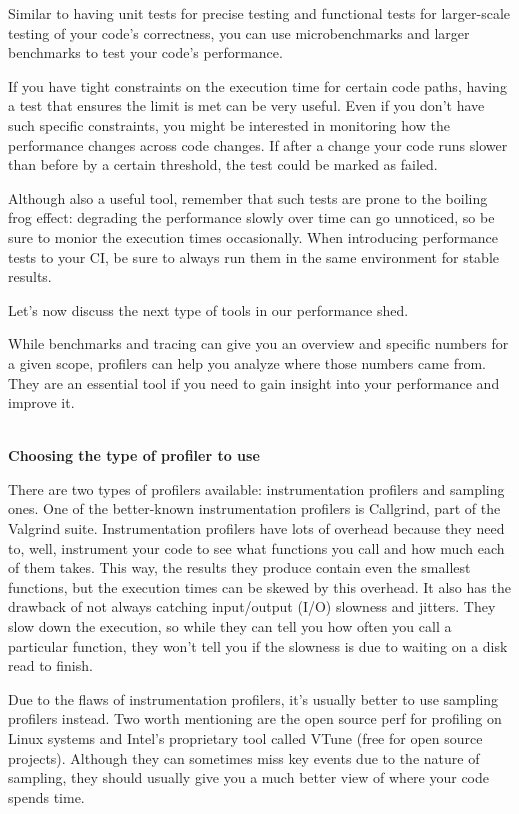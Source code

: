 Similar to having unit tests for precise testing and functional tests for larger-scale testing of your code's correctness, you can use microbenchmarks and larger benchmarks to test your code's performance.

If you have tight constraints on the execution time for certain code paths, having a test that ensures the limit is met can be very useful. Even if you don't have such specific constraints, you might be interested in monitoring how the performance changes across code changes. If after a change your code runs slower than before by a certain threshold, the test could be marked as failed.

Although also a useful tool, remember that such tests are prone to the boiling frog effect: degrading the performance slowly over time can go unnoticed, so be sure to monior the execution times occasionally. When introducing performance tests to your CI, be sure to always run them in the same environment for stable results.

Let's now discuss the next type of tools in our performance shed.


While benchmarks and tracing can give you an overview and specific numbers for a given scope, profilers can help you analyze where those numbers came from. They are an essential tool if you need to gain insight into your performance and improve it.

\hspace*{\fill} \\ %
\noindent
\textbf{Choosing the type of profiler to use}

There are two types of profilers available: instrumentation profilers and sampling ones. One of the better-known instrumentation profilers is Callgrind, part of the Valgrind suite. Instrumentation profilers have lots of overhead because they need to, well, instrument your code to see what functions you call and how much each of them takes. This way, the results they produce contain even the smallest functions, but the execution times can be skewed by this overhead. It also has the drawback of not always catching input/output (I/O) slowness and jitters. They slow down the execution, so while they can tell you how often you call a particular function, they won't tell you if the slowness is due to waiting on a disk read to finish.

Due to the flaws of instrumentation profilers, it's usually better to use sampling profilers instead. Two worth mentioning are the open source perf for profiling on Linux systems and Intel's proprietary tool called VTune (free for open source projects). Although they can sometimes miss key events due to the nature of sampling, they should usually give you a much better view of where your code spends time.

